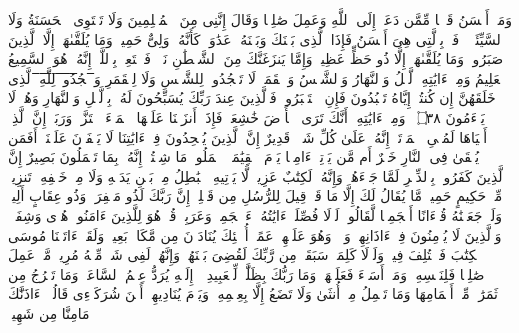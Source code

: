 \startbuffer[\q:41:33]
وَمَنۡ أَحۡسَنُ قَوۡلࣰا مِّمَّن دَعَاۤ إِلَى ٱللَّهِ وَعَمِلَ صَٰلِحࣰا وَقَالَ إِنَّنِی مِنَ ٱلۡمُسۡلِمِینَ%
\stopbuffer
\startbuffer[\q:41:34]
وَلَا تَسۡتَوِی ٱلۡحَسَنَةُ وَلَا ٱلسَّیِّئَةُۚ ٱدۡفَعۡ بِٱلَّتِی هِیَ أَحۡسَنُ فَإِذَا ٱلَّذِی بَیۡنَكَ وَبَیۡنَهُۥ عَدَٰوَةࣱ كَأَنَّهُۥ وَلِیٌّ حَمِیمࣱ%
\stopbuffer
\startbuffer[\q:41:35]
وَمَا یُلَقَّىٰهَاۤ إِلَّا ٱلَّذِینَ صَبَرُوا۟ وَمَا یُلَقَّىٰهَاۤ إِلَّا ذُو حَظٍّ عَظِیمࣲ%
\stopbuffer
\startbuffer[\q:41:36]
وَإِمَّا یَنزَغَنَّكَ مِنَ ٱلشَّیۡطَٰنِ نَزۡغࣱ فَٱسۡتَعِذۡ بِٱللَّهِۖ إِنَّهُۥ هُوَ ٱلسَّمِیعُ ٱلۡعَلِیمُ%
\stopbuffer
\startbuffer[\q:41:37]
وَمِنۡ ءَایَٰتِهِ ٱلَّیۡلُ وَٱلنَّهَارُ وَٱلشَّمۡسُ وَٱلۡقَمَرُۚ لَا تَسۡجُدُوا۟ لِلشَّمۡسِ وَلَا لِلۡقَمَرِ وَ̅ٱ̅سۡ̅جُ̅دُ̅و̅ا۟̅ ̅لِ̅لَّ̅هِ̅ ٱلَّذِی خَلَقَهُنَّ إِن كُنتُمۡ إِیَّاهُ تَعۡبُدُونَ%
\stopbuffer
\startbuffer[\q:41:38]
فَإِنِ ٱسۡتَكۡبَرُوا۟ فَٱلَّذِینَ عِندَ رَبِّكَ یُسَبِّحُونَ لَهُۥ بِٱلَّیۡلِ وَٱلنَّهَارِ وَهُمۡ لَا یَسۡءَمُونَ ۝٣٨ ۩%
\stopbuffer
\startbuffer[\q:41:39]
وَمِنۡ ءَایَٰتِهِۦۤ أَنَّكَ تَرَى ٱلۡأَرۡضَ خَٰشِعَةࣰ فَإِذَاۤ أَنزَلۡنَا عَلَیۡهَا ٱلۡمَاۤءَ ٱهۡتَزَّتۡ وَرَبَتۡۚ إِنَّ ٱلَّذِیۤ أَحۡیَاهَا لَمُحۡیِ ٱلۡمَوۡتَىٰۤۚ إِنَّهُۥ عَلَىٰ كُلِّ شَیۡءࣲ قَدِیرٌ%
\stopbuffer
\startbuffer[\q:41:40]
إِنَّ ٱلَّذِینَ یُلۡحِدُونَ فِیۤ ءَایَٰتِنَا لَا یَخۡفَوۡنَ عَلَیۡنَاۤۗ أَفَمَن یُلۡقَىٰ فِی ٱلنَّارِ خَیۡرٌ أَم مَّن یَأۡتِیۤ ءَامِنࣰا یَوۡمَ ٱلۡقِیَٰمَةِۚ ٱعۡمَلُوا۟ مَا شِئۡتُمۡ إِنَّهُۥ بِمَا تَعۡمَلُونَ بَصِیرٌ%
\stopbuffer
\startbuffer[\q:41:41]
إِنَّ ٱلَّذِینَ كَفَرُوا۟ بِٱلذِّكۡرِ لَمَّا جَاۤءَهُمۡۖ وَإِنَّهُۥ لَكِتَٰبٌ عَزِیزࣱ%
\stopbuffer
\startbuffer[\q:41:42]
لَّا یَأۡتِیهِ ٱلۡبَٰطِلُ مِنۢ بَیۡنِ یَدَیۡهِ وَلَا مِنۡ خَلۡفِهِۦۖ تَنزِیلࣱ مِّنۡ حَكِیمٍ حَمِیدࣲ%
\stopbuffer
\startbuffer[\q:41:43]
مَّا یُقَالُ لَكَ إِلَّا مَا قَدۡ قِیلَ لِلرُّسُلِ مِن قَبۡلِكَۚ إِنَّ رَبَّكَ لَذُو مَغۡفِرَةࣲ وَذُو عِقَابٍ أَلِیمࣲ%
\stopbuffer
\startbuffer[\q:41:44]
وَلَوۡ جَعَلۡنَٰهُ قُرۡءَانًا أَعۡجَمِیࣰّا لَّقَالُوا۟ لَوۡلَا فُصِّلَتۡ ءَایَٰتُهُۥۤۖ ءَا۬عۡجَمِیࣱّ وَعَرَبِیࣱّۗ قُلۡ هُوَ لِلَّذِینَ ءَامَنُوا۟ هُدࣰى وَشِفَاۤءࣱۚ وَٱلَّذِینَ لَا یُؤۡمِنُونَ فِیۤ ءَاذَانِهِمۡ وَقۡرࣱ وَهُوَ عَلَیۡهِمۡ عَمًىۚ أُو۟لَٰۤئِكَ یُنَادَوۡنَ مِن مَّكَانِۭ بَعِیدࣲ%
\stopbuffer
\startbuffer[\q:41:45]
وَلَقَدۡ ءَاتَیۡنَا مُوسَى ٱلۡكِتَٰبَ فَٱخۡتُلِفَ فِیهِۚ وَلَوۡلَا كَلِمَةࣱ سَبَقَتۡ مِن رَّبِّكَ لَقُضِیَ بَیۡنَهُمۡۚ وَإِنَّهُمۡ لَفِی شَكࣲّ مِّنۡهُ مُرِیبࣲ%
\stopbuffer
\startbuffer[\q:41:46]
مَّنۡ عَمِلَ صَٰلِحࣰا فَلِنَفۡسِهِۦۖ وَمَنۡ أَسَاۤءَ فَعَلَیۡهَاۗ وَمَا رَبُّكَ بِظَلَّٰمࣲ لِّلۡعَبِیدِ%
\stopbuffer
\startbuffer[\q:41:47]
۞ إِلَیۡهِ یُرَدُّ عِلۡمُ ٱلسَّاعَةِۚ وَمَا تَخۡرُجُ مِن ثَمَرَٰتࣲ مِّنۡ أَكۡمَامِهَا وَمَا تَحۡمِلُ مِنۡ أُنثَىٰ وَلَا تَضَعُ إِلَّا بِعِلۡمِهِۦۚ وَیَوۡمَ یُنَادِیهِمۡ أَیۡنَ شُرَكَاۤءِی قَالُوۤا۟ ءَاذَنَّٰكَ مَامِنَّا مِن شَهِیدࣲ%
